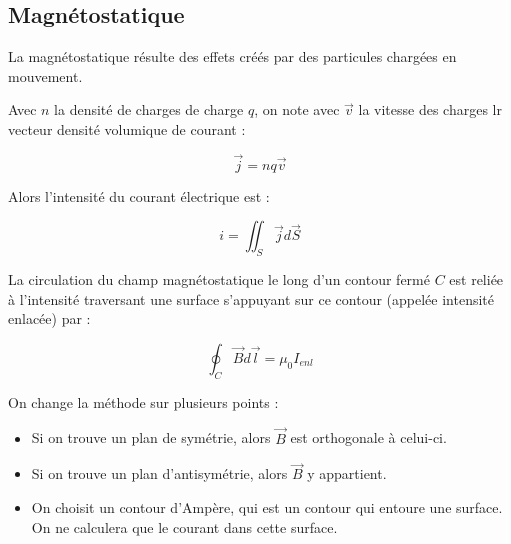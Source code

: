 \documentclass[a4paper,12pt]{book}
\newcommand{\Def}[2]{\begin{tcolorbox}[colback=white,colframe=red!10!green!20!blue!75!, title=Définition : #1]#2\end{tcolorbox}}
\newcommand{\Thr}[2]{\begin{tcolorbox}[sharp corners, colback=white,colframe=red!10!blue!30!green!75!, title=Théorème : #1]#2\end{tcolorbox}}
\renewcommand{\Vec}[1]{\overrightarrow{#1}}
\begin{document}
\subsection{Magnétostatique}
La magnétostatique résulte des effets créés par des particules chargées en mouvement.
\Def{Courant}{Avec $n$ la densité de charges de charge $q$, on note avec $\Vec{v}$ la vitesse des charges lr vecteur densité volumique de courant :
\par $$\Vec{j} = nq\Vec{v}$$
\par Alors l'intensité du courant électrique est :
\par $$i = \iint_S\Vec{j}d\Vec{S}$$}
\Thr{Théorème d'Ampère}{La circulation du champ magnétostatique le long d'un contour fermé $C$ est reliée à l'intensité traversant une surface s'appuyant sur ce contour (appelée intensité enlacée) par :
\par $$\oint_C\Vec{B}d\Vec{l} =\mu_0I_{enl}$$}
On change la méthode sur plusieurs points :\begin{itemize}
\item Si on trouve un plan de symétrie, alors $\Vec{B}$ est orthogonale à celui-ci.
\item Si on trouve un plan d'antisymétrie, alors $\Vec{B}$ y appartient.
\item On choisit un contour d'Ampère, qui est un contour qui entoure une surface. On ne calculera que le courant dans cette surface.
\end{itemize}
\end{document}
